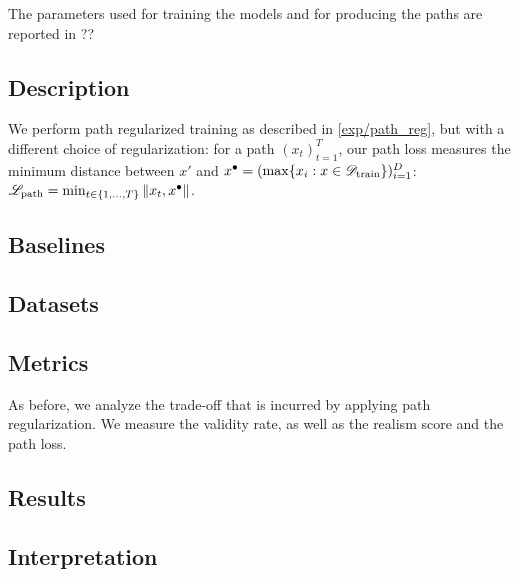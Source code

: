 \documentclass[../main.tex]{subfiles}
\begin{document}
The parameters used for training the models and for producing the paths are reported in ?? 

\subsection{Description}

We perform path regularized training as described in \autoref{exp/path_reg}, but with a different choice of regularization: for a path $(x_t)_{t=1}^T$, our path loss measures the minimum distance between $x'$ and $x^\bullet = (\max\{ x_i : x \in \mathscr{D}_\text{train} \})_{i=1}^D$: $\mathscr{L}_\text{path} = \min_{t \in \{1, \ldots, T\}} \left\lVert x_t, x^\bullet\right\rVert$.

\subsection{Baselines}

\subsection{Datasets}

\subsection{Metrics}

As before, we analyze the trade-off that is incurred by applying path regularization.
We measure the validity rate, as well as the realism score and the path loss.

\subsection{Results}

\subsection{Interpretation}
\end{document}
